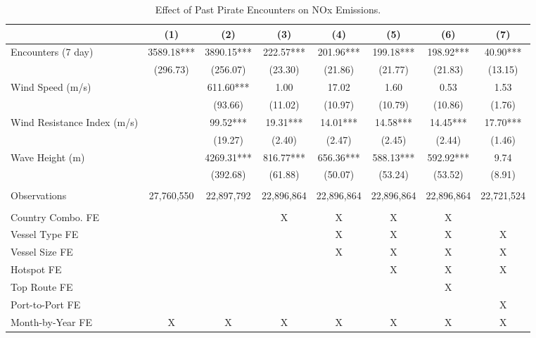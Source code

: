 \begin{table}
\centering
\caption{Effect of Past Pirate Encounters on NOx Emissions. \label{tab:spec-nox-table}}
\centering
\begin{adjustbox}{width = .9\textwidth}
\begin{threeparttable}
\begin{tabular}[t]{lccccccc}
\toprule
  & (1) & (2) & (3) & (4) & (5) & (6) & (7)\\
\midrule
Encounters (7 day) & \num{3589.18}*** & \num{3890.15}*** & \num{222.57}*** & \num{201.96}*** & \num{199.18}*** & \num{198.92}*** & \num{40.90}***\\
 & (\num{296.73}) & (\num{256.07}) & (\num{23.30}) & (\num{21.86}) & (\num{21.77}) & (\num{21.83}) & (\num{13.15})\\
Wind Speed (m/s) &  & \num{611.60}*** & \num{1.00} & \num{17.02} & \num{1.60} & \num{0.53} & \num{1.53}\\
 &  & (\num{93.66}) & (\num{11.02}) & (\num{10.97}) & (\num{10.79}) & (\num{10.86}) & (\num{1.76})\\
Wind Resistance Index (m/s) &  & \num{99.52}*** & \num{19.31}*** & \num{14.01}*** & \num{14.58}*** & \num{14.45}*** & \num{17.70}***\\
 &  & (\num{19.27}) & (\num{2.40}) & (\num{2.47}) & (\num{2.45}) & (\num{2.44}) & (\num{1.46})\\
Wave Height (m) &  & \num{4269.31}*** & \num{816.77}*** & \num{656.36}*** & \num{588.13}*** & \num{592.92}*** & \num{9.74}\\
 &  & (\num{392.68}) & (\num{61.88}) & (\num{50.07}) & (\num{53.24}) & (\num{53.52}) & (\num{8.91})\\
 &  &  &  &  &  &  & \\
Observations & 27,760,550 & 22,897,792 & 22,896,864 & 22,896,864 & 22,896,864 & 22,896,864 & 22,721,524\\
 &  &  &  &  &  &  & \\
Country Combo. FE &  &  & X & X & X & X & \\
Vessel Type FE &  &  &  & X & X & X & X\\
Vessel Size FE &  &  &  & X & X & X & X\\
Hotspot FE &  &  &  &  & X & X & X\\
Top Route FE &  &  &  &  &  & X & \\
Port-to-Port FE &  &  &  &  &  &  & X\\
Month-by-Year FE & X & X & X & X & X & X & X\\
\bottomrule
\end{tabular}

\end{threeparttable}
\end{adjustbox}
\end{table}
